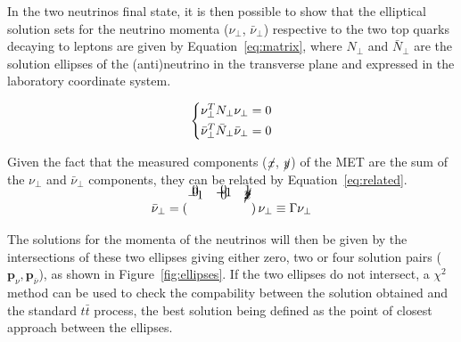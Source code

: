 \documentclass[a4paper, 10pt, openright]{report}
\begin{document}
\begin{itemize}
In the two neutrinos final state, it is then possible to show that the elliptical solution sets for the neutrino momenta ($\nu_\perp$, $\bar \nu_\perp$) respective to the two top quarks decaying to leptons are given by Equation~\ref{eq:matrix}, where $N_\perp$ and $\bar N_\perp$ are the solution ellipses of the (anti)neutrino in the transverse plane and expressed in the laboratory coordinate system.


\begin{equation}
\label{eq:matrix}
\begin{dcases}
\nu_\perp^T N_\perp \nu_\perp = 0 \\
\bar \nu_\perp^T \bar N_\perp \bar \nu_\perp = 0
\end{dcases}
\end{equation}

Given the fact that the measured components ($\cancel{x}$, $\cancel{y}$) of the \ac{MET} are the sum of the $\nu_\perp$ and $\bar \nu_\perp$ components, they can be related by Equation~\ref{eq:related}.

\begin{equation}
\label{eq:related}
\bar \nu_\perp = \begin{pmatrix}
\\[-1.3cm] -1 & 0 & \cancel{x} \\[-0.5cm]
0 & -1 & \cancel{y} \\[-0.5cm]
0 & 0 & 1
\end{pmatrix} \nu_\perp \equiv \Gamma \nu_\perp
\end{equation}

The solutions for the momenta of the neutrinos will then be given by the intersections of these two ellipses giving either zero, two or four solution pairs ($\bm{p}_\nu, \bm{p}_{\bar \nu}$), as shown in Figure~\ref{fig:ellipses}. If the two ellipses do not intersect, a $\chi^2$ method can be used to check the compability between the solution obtained and the standard $t \bar t$ process, the best solution being defined as the point of closest approach between the ellipses.


\end{itemize}
\end{document}
